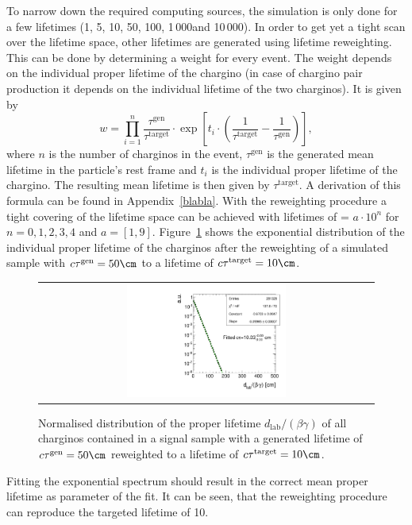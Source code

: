 To narrow down the required computing sources, the simulation is only done for a few lifetimes (1\cm, 5\cm, 10\cm, 50\cm, 100\cm, 1\,000\cm and 10\,000\cm).
In order to get yet a tight scan over the lifetime space, other lifetimes are generated using lifetime reweighting.
This can be done by determining a weight for every event.
The weight depends on the individual proper lifetime of the chargino (in case of chargino pair production it depends on the individual lifetime of the two charginos).
It is given by
\begin{equation*}
w = \prod_{i=1}^n \frac{\tau^{\text{gen}}}{\tau^{\text{target}}}\cdot  \exp \left[ t_i \cdot \left( \frac{1}{\tau^{\text{target}}} - \frac{1}{\tau^{\text{gen}}} \right) \right] ,
\end{equation*}
where $n$ is the  number of charginos in the event, $\tau^{\text{gen}}$ is the generated mean lifetime in the particle's rest frame and $t_i$ is the individual proper lifetime of the chargino. 
The resulting mean lifetime is then given by $\tau^{\text{target}}$. A derivation of this formula can be found in Appendix~\ref{blabla}.
With the reweighting procedure a tight covering of the lifetime space can be achieved with lifetimes of \ctau = $a\cdot10^{n}$ for $n=0,1,2,3,4$ and $a=\left[1,9\right]$.
Figure~\ref{fig:LifetimeReweighting} shows the exponential distribution of the individual proper lifetime of the charginos after the reweighting of a simulated sample with $c\tau^{\text{gen}}=50\cm$ to a lifetime of $c\tau^{\text{target}}=10\cm$.
\begin{figure}[!t]
  \centering 
  \begin{tabular}{c}
    \includegraphics[width=0.49\textwidth]{figures/analysis/10cm.pdf}
  \end{tabular}
  \caption{Normalised distribution of the proper lifetime $d_{\text{lab}}/\left(\beta\gamma \right)$ of all charginos contained in a signal sample with a generated lifetime of $c\tau^{\text{gen}}=50\cm$ reweighted to a lifetime of $c\tau^{\text{target}}=10\cm$.}
  \label{fig:LifetimeReweighting}
\end{figure}
Fitting the exponential spectrum should result in the correct mean proper lifetime as parameter of the fit.
It can be seen, that the reweighting procedure can reproduce the targeted lifetime of 10\cm.

